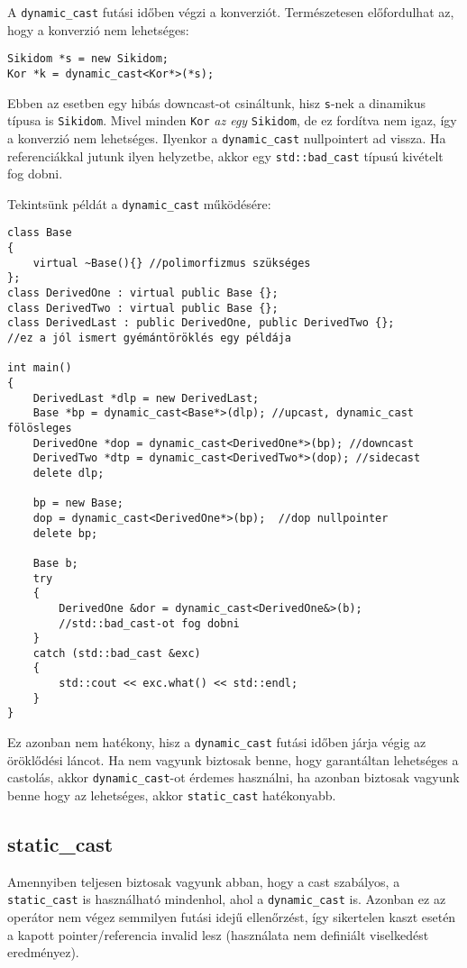 \documentclass[a4paper,11.5pt,table]{article}
\begin{document}
	A \texttt{dynamic\_cast} futási időben végzi a konverziót. Természetesen előfordulhat az, hogy a konverzió nem lehetséges:
	\begin{lstlisting}
Sikidom *s = new Sikidom;
Kor *k = dynamic_cast<Kor*>(*s);
	\end{lstlisting}
	Ebben az esetben egy hibás downcast-ot csináltunk, hisz \texttt{s}-nek a dinamikus típusa is \texttt{Sikidom}. Mivel minden \texttt{Kor} \textit{az egy} \texttt{Sikidom}, de ez fordítva nem igaz, így a konverzió nem lehetséges. Ilyenkor a \texttt{dynamic\_cast} nullpointert ad vissza. Ha referenciákkal jutunk ilyen helyzetbe, akkor egy \texttt{std::bad\_cast} típusú kivételt fog dobni.
	
	\smallskip
	Tekintsünk példát a \texttt{dynamic\_cast} működésére:
	\begin{lstlisting}
class Base 
{
	virtual ~Base(){} //polimorfizmus szükséges
};
class DerivedOne : virtual public Base {};
class DerivedTwo : virtual public Base {};
class DerivedLast : public DerivedOne, public DerivedTwo {};
//ez a jól ismert gyémántöröklés egy példája

int main()
{
	DerivedLast *dlp = new DerivedLast;
	Base *bp = dynamic_cast<Base*>(dlp); //upcast, dynamic_cast fölösleges
	DerivedOne *dop = dynamic_cast<DerivedOne*>(bp); //downcast
	DerivedTwo *dtp = dynamic_cast<DerivedTwo*>(dop); //sidecast
	delete dlp;
	
	bp = new Base;
	dop = dynamic_cast<DerivedOne*>(bp);  //dop nullpointer
	delete bp;
	
	Base b;
	try
	{
		DerivedOne &dor = dynamic_cast<DerivedOne&>(b); 
		//std::bad_cast-ot fog dobni
	}
	catch (std::bad_cast &exc)
	{
		std::cout << exc.what() << std::endl;
	}
}
	\end{lstlisting}
	
	Ez azonban nem hatékony, hisz a \texttt{dynamic\_cast} futási időben járja végig az öröklődési láncot. Ha nem vagyunk biztosak benne, hogy garantáltan lehetséges a castolás, akkor \texttt{dynamic\_cast}-ot érdemes használni, ha azonban biztosak vagyunk benne hogy az lehetséges, akkor \texttt{static\_cast} hatékonyabb.
	\subsection{static\_cast}
	Amennyiben teljesen biztosak vagyunk abban, hogy a cast szabályos, a \texttt{static\_cast} is használható mindenhol, ahol a \texttt{dynamic\_cast} is. Azonban ez az operátor nem végez semmilyen futási idejű ellenőrzést, így sikertelen kaszt esetén a kapott pointer/referencia invalid lesz (használata nem definiált viselkedést eredményez).
	
\end{document}
